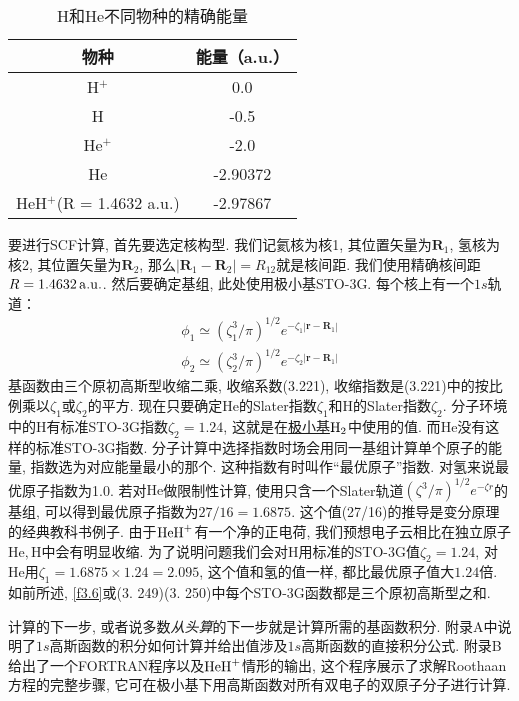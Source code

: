 \begin{table}[H]
	\centering
	\caption{H和He不同物种的精确能量}
	\begin{tabular}{cc}
		\hline
		物种 & 能量（a.u.）\\\hline
		H$^+$      & 0.0\\
		H     & -0.5\\
		He$^+$     & -2.0\\
		He     & -2.90372\\
		HeH$^+$(R = 1.4632 a.u.)&-2.97867\\\hline
	\end{tabular}
	\label{t3.4}
\end{table}
要进行SCF计算, 首先要选定核构型. 
我们记氦核为核1, 其位置矢量为$\mathbf{R}_1$, 
氢核为核2, 其位置矢量为$\mathbf{R}_2$, 
那么$|\mathbf{R}_1-\mathbf{R}_2|=R_{12}$就是核间距. 
我们使用精确核间距$R=1.4632\,\mathrm{a.u.}$. 
然后要确定基组, 此处使用极小基STO-3G. 
每个核上有一个$1s$轨道：
\begin{align}
	\phi_1 \simeq (\zeta_1^3/\pi)^{1/2} e^{-\zeta_1|\mathbf{r-R}_1|}\\
	\phi_2 \simeq (\zeta_2^3/\pi)^{1/2} e^{-\zeta_2|\mathbf{r-R}_1|}
\end{align}
基函数由三个原初高斯型收缩二乘, 
收缩系数(3.221), 
收缩指数是(3.221)中的按比例乘以$\zeta_1$或$\zeta_2$的平方. 
现在只要确定$\mathrm{He}$的Slater指数$\zeta_1$和$\mathrm{H}$的Slater指数$\zeta_2$. 
分子环境中的$\mathrm{H}$有标准STO-3G指数$\zeta_2=1.24$, 
这就是在\underline{极小基$\mathrm{H}_2$}中使用的值. 
而$\mathrm{He}$没有这样的标准STO-3G指数. 
分子计算中选择指数时场会用同一基组计算单个原子的能量, 
指数选为对应能量最小的那个. 
这种指数有时叫作``最优原子''指数. 
对氢来说最优原子指数为1.0. 
若对$\mathrm{He}$做限制性\hft 计算, 
使用只含一个Slater轨道$(\zeta^3/\pi)^{1/2}e^{-\zeta r}$的基组, 
可以得到最优原子指数为$27/16=1.6875$. 
这个值(27/16)的推导是变分原理的经典教科书例子.
由于$\mathrm{HeH}^+$有一个净的正电荷, 
我们预想电子云相比在独立原子$\mathrm{He,H}$中会有明显收缩. 
为了说明问题我们会对$\mathrm{H}$用标准的STO-3G值$\zeta_2=1.24$, 
对$\mathrm{He}$用$\zeta_1=1.6875\times 1.24=2.095$, 
这个值和氢的值一样, 
都比最优原子值大$1.24$倍. 
如前所述, 
\ref{f3.6}或(3.
249)(3.
250)中每个STO-3G函数都是三个原初高斯型之和.


计算的下一步, 
或者说多数\emph{从头算}的下一步就是计算所需的基函数积分. 
附录A中说明了$1s$高斯函数的积分如何计算并给出值涉及$1s$高斯函数的直接积分公式. 
附录B给出了一个FORTRAN程序以及$\mathrm{HeH}^+$情形的输出, 
这个程序展示了求解Roothaan方程的完整步骤, 
它可在极小基下用高斯函数对所有双电子的双原子分子进行计算. 

